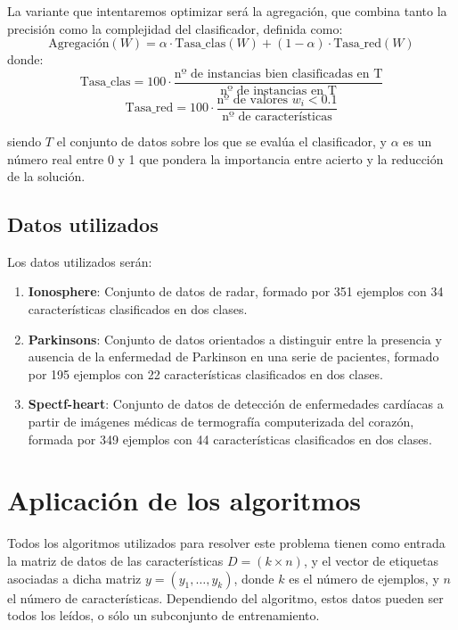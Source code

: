 \documentclass[11pt,a4paper]{article}
\begin{document}
La variante que intentaremos optimizar será la agregación, que combina tanto la precisión como la complejidad del clasificador, definida como:
\begin{equation} \label{eq:objetivo}
\text{Agregación}(W) = \alpha \cdot \text{Tasa\_clas}(W) + (1 - \alpha) \cdot \text{Tasa\_red}(W)
\end{equation}
donde:
\begin{equation} \label{eq:clas}
\text{Tasa\_clas} = 100 \cdot \frac{\text{nº de instancias bien clasificadas en T}}{\text{nº de instancias en T}}
\end{equation}
\begin{equation} \label{eq:red}
\text{Tasa\_red} = 100 \cdot \frac{\text{nº de valores } w_{i} < 0.1}{\text{nº de características}}
\end{equation}

siendo $T$ el conjunto de datos sobre los que se evalúa el clasificador, y $\alpha$ es un número real entre 0 y 1 que pondera la importancia entre acierto y la reducción de la solución.

\subsection{Datos utilizados}

Los datos utilizados serán:
\begin{enumerate}
\item \textbf{Ionosphere}: Conjunto de datos de radar, formado por 351 ejemplos con 34 características clasificados en dos clases.
\item \textbf{Parkinsons}: Conjunto de datos orientados a distinguir entre la presencia y ausencia de la enfermedad de Parkinson en una serie de pacientes, formado por 195 ejemplos con 22 características clasificados en dos clases.
\item \textbf{Spectf-heart}: Conjunto de datos de detección de enfermedades cardíacas a partir de imágenes médicas de termografía computerizada del corazón, formada por 349 ejemplos con 44 características clasificados en dos clases.
\end{enumerate}

\newpage
\section{Aplicación de los algoritmos} \label{sec:algorithms}
Todos los algoritmos utilizados para resolver este problema tienen como entrada la matriz de datos de las características $D = (k \times n)$, y el vector de etiquetas asociadas a dicha matriz $y = (y_{1}, \dots, y_{k})$, donde $k$ es el número de ejemplos, y $n$ el número de características. Dependiendo del algoritmo, estos datos pueden ser todos los leídos, o sólo un subconjunto de entrenamiento.
\end{document}

